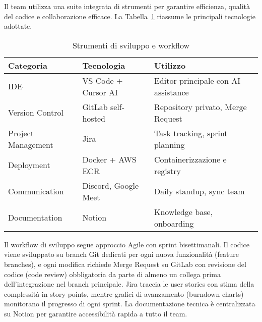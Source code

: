 Il team utilizza una suite integrata di strumenti per garantire efficienza, 
qualità del codice e collaborazione efficace. La Tabella~\ref{tab:dev-tools} 
riassume le principali tecnologie adottate.

\clearpage
\begin{table}[h]
\centering
\caption{Strumenti di sviluppo e workflow}
\label{tab:dev-tools}
\begin{tabular}{|l|l|p{6cm}|}
\hline
\textbf{Categoria} & \textbf{Tecnologia} & \textbf{Utilizzo} \\
\hline
IDE & VS Code + Cursor AI & Editor principale con AI assistance \\
\hline
Version Control & GitLab self-hosted & Repository privato, Merge Request \\
\hline
Project Management & Jira & Task tracking, sprint planning \\
\hline
Deployment & Docker + AWS ECR & Containerizzazione e registry \\
\hline
Communication & Discord, Google Meet & Daily standup, sync team \\
\hline
Documentation & Notion & Knowledge base, onboarding \\
\hline
\end{tabular}
\end{table}

Il workflow di sviluppo segue approccio Agile con sprint bisettimanali. Il 
codice viene sviluppato su branch Git dedicati per ogni nuova funzionalità 
(feature branches), e ogni modifica richiede Merge Request su GitLab con 
revisione del codice (code review) obbligatoria da parte di almeno un 
collega prima dell'integrazione nel branch principale. Jira traccia le user 
stories con stima della complessità in story points, mentre grafici di 
avanzamento (burndown charts) monitorano il progresso di ogni sprint. La 
documentazione tecnica è centralizzata su Notion per garantire accessibilità 
rapida a tutto il team.